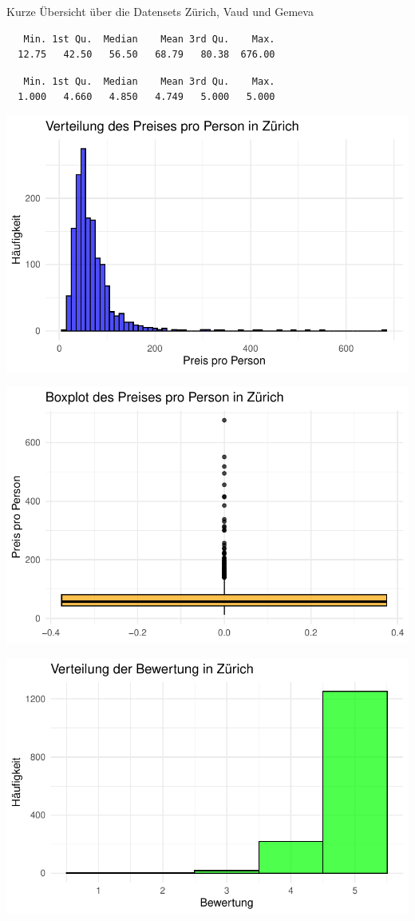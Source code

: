 \documentclass[
  journal,
]{IEEEtran}%
\begin{document}
Kurze Übersicht über die Datensets Zürich, Vaud und Gemeva

\begin{verbatim}
   Min. 1st Qu.  Median    Mean 3rd Qu.    Max. 
  12.75   42.50   56.50   68.79   80.38  676.00 
\end{verbatim}

\begin{verbatim}
   Min. 1st Qu.  Median    Mean 3rd Qu.    Max. 
  1.000   4.660   4.850   4.749   5.000   5.000 
\end{verbatim}

\includegraphics{main_files/figure-pdf/unnamed-chunk-8-1.pdf}

\includegraphics{main_files/figure-pdf/unnamed-chunk-8-2.pdf}

\includegraphics{main_files/figure-pdf/unnamed-chunk-8-3.pdf}
\end{document}
